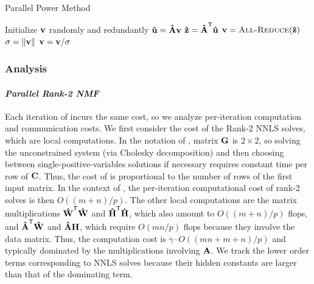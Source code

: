 \documentclass[conference,compsoc]{IEEEtran}
\begin{document}
\begin{algorithm}
\caption{Parallel Power Method}
\label{alg:parpowmeth}
\begin{algorithmic}[1]
		\State Initialize $\V{v}$ randomly and redundantly
			\State $\V[\hat]{u} = \M[\hat]{A} \V{v}$
			\State $\V[\hat]{z} = \M[\hat]{A}^\Tra \V[\hat]{u}$
			\State $\V{v} = \textsc{All-Reduce}(\V[\hat]{z})$
			\State $\sigma = \|\V{v}\|$
			\State $\V{v} = \V{v}/\sigma$
		\EndWhile
	\EndFunction
\end{algorithmic}
\end{algorithm}


\subsubsection{Analysis}
\label{sec:analysis}

\paragraph{\emph{Parallel Rank-2 NMF}}

Each iteration of  incurs the same cost, so we analyze per-iteration computation and communication costs.
We first consider the cost of the Rank-2 NNLS solves, which are local computations.
In the notation of , matrix $\M{G}$ is $2\times 2$, so solving the unconstrained system (via Cholesky decomposition) and then choosing between single-positive-variables solutions if necessary requires constant time per row of $\M{C}$.
Thus, the cost of  is proportional to the number of rows of the first input matrix.
In the context of , the per-iteration computational cost of rank-2 solves is then $O((m+n)/p)$.
The other local computations are the matrix multiplications $\M[\hat]{W}^\Tra \M[\hat]{W}$ and $\M[\hat]{H}^\Tra \M[\hat]{H}$, which also amount to $O((m+n)/p)$ flops, and $\M[\hat]{A}^\Tra \M[\hat]{W}$ and $\M[\hat]{A} \M{H}$, which require $O(mn/p)$ flops because they involve the data matrix.
Thus, the computation cost is $\gamma \cdot O((mn+m+n)/p)$ and typically dominated by the multiplications involving $\M{A}$.
We track the lower order terms corresponding to NNLS solves because their hidden constants are larger than that of the dominating term.
\end{document}
